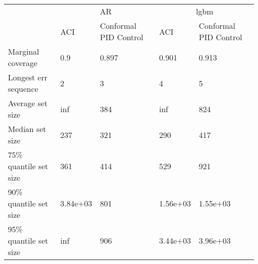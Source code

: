 \begin{tabular}{lllll}
\toprule
& \multicolumn{2}{c}{AR}& \multicolumn{2}{c}{lgbm} \\
& ACI & Conformal PID Control & ACI & Conformal PID Control \\
\midrule
Marginal coverage & 0.9 & 0.897 & 0.901 & 0.913 \\
Longest err sequence & 2 & 3 & 4 & 5 \\
Average set size & inf & 384 & inf & 824 \\
Median set size & 237 & 321 & 290 & 417 \\
75\% quantile set size & 361 & 414 & 529 & 921 \\
90\% quantile set size & 3.84e+03 & 801 & 1.56e+03 & 1.55e+03 \\
95\% quantile set size & inf & 906 & 3.44e+03 & 3.96e+03 \\
\bottomrule
\end{tabular}
